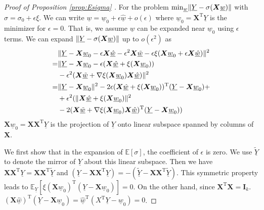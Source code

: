 \documentclass[conference]{IEEEtran}
\DeclarePairedDelimiter\norm{\lVert}{\rVert}
\def\E{\mathbb{E}}
\def\T{\mathrm{T}}
\begin{document}
\begin{proof}[Proof of Proposition \ref{prop:Esigma} ]
For the problem $\min_{\underline{w}} \norm{\underline{Y} - \sigma(\bm{X} \underline{w})}$
with $\sigma = \sigma_0 + \epsilon \xi$. We can write $\underline{w} = \underline{w}_0
+ \epsilon \underline{\hat{w}} + o(\epsilon)$ where $\underline{w}_0 = \bm{X}^\T \underline{Y}$ is the minimizer for
$\epsilon = 0$. That is, we assume $\underline{w}$ can be expanded near $\underline{w}_0$
using $\epsilon$ terms. We can expand $\norm{\underline{Y} - \sigma(\bm{X} \underline{w})}$ 
up to $o(\epsilon^2)$ as
\begin{align*}
&\norm{\underline{Y} - \bm{X} \underline{w}_0 - \epsilon \bm{X} \underline{\hat{w}} -
\epsilon^2 \bm{X} \underline{\tilde{w}} - \epsilon \xi(\bm{X} \underline{w}_0 +
\epsilon \bm{X} \underline{\hat{w}}) }^2 \\
= & \norm{ \underline{Y} - \bm{X}  \underline{w}_0 -
\epsilon (\bm{X}\underline{\hat{w}} + \xi(\bm{X} \underline{w}_0 )) \\
&-  \epsilon^2(\bm{X}\underline{\tilde{w}} + \nabla \xi(\bm{X} \underline{w}_0 )\bm{X}\underline{\hat{w}})}^2 \\
= & \norm{\underline{Y}-\bm{X} \underline{w}_0  }^2 -
2 \epsilon (\bm{X} \underline{\hat{w}} +
\xi(\bm{X} \underline{w}_0))^\T (\underline{Y} - \bm{X} \underline{w}_0) +\\
& +  \epsilon^2(\norm{\bm{X}\underline{\hat{w}} + \xi(\bm{X} \underline{w}_0)}^2 \\
& -
2 (\bm{X} \underline{\tilde{w}}+
\nabla \xi(\bm{X} \underline{w}_0)\bm{X}\underline{\hat{w}})^\T(\underline{Y}-\bm{X} \underline{w}_0))
\end{align*}
$\bm{X}\underline{w}_0 = \bm{X}\bm{X}^\T \underline{Y}$ is the projection of $\underline{Y}$ onto linear subspace spanned by
columns of $\bm{X}$.

We first show that in the expansion of $\E[\sigma]$, the coefficient of $\epsilon$ is zero.
We use $\tilde{\underline{Y}}$ to denote the mirror of $\underline{Y}$ about this linear subspace.
Then we have
$\bm{X}\bm{X}^\T \underline{Y} = \bm{X}\bm{X}^\T \tilde{\underline{Y}}$ and
$(\underline{Y}- \bm{X}\bm{X}^\T\underline{Y}) = -(\tilde{\underline{Y}} - \bm{X}\bm{X}^\T \tilde{\underline{Y}})$.
This symmetric property leads to $\E_{\underline{Y}}[\xi(\bm{X}\underline{w}_0)^\T (\underline{Y}-\bm{X}\underline{w}_0)]=0$.
On the other hand, since $\bm{X}^\T \bm{X} = \mathbf{I}_k$. $(\bm{X}\underline{\hat{w}})^\T (\underline{Y}-\bm{X}\underline{w}_0) = \underline{\hat{w}}^\T (X^\T \underline{Y} - \underline{w}_0) = 0$.


\end{proof}
\end{document}
